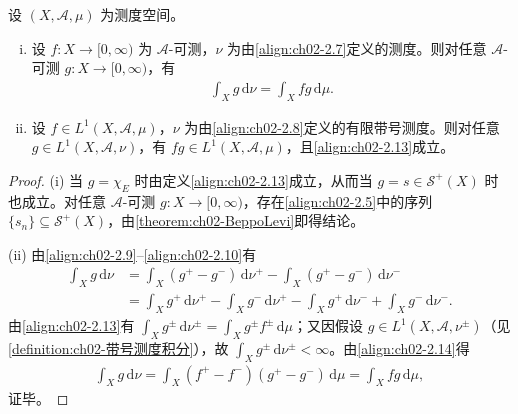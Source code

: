 \documentclass[../../main.tex]{subfiles}%
\begin{document}
\begin{proposition}\label{proposition:ch02-变量替换积分}
设 $(X,\mathscr A,\mu)$ 为测度空间。
\begin{enumerate}[(i)]
\item 设 $f:X\to[0,\infty)$ 为 $\mathscr A$-可测，$\nu$ 为由\eqref{align:ch02-2.7}定义的测度。则对任意 $\mathscr A$-可测 $g:X\to[0,\infty)$，有
\begin{align}
\int_X g\,\mathrm{d}\nu=\int_X fg\,\mathrm{d}\mu. \label{align:ch02-2.13}
\end{align}
\item 设 $f\in L^1(X,\mathscr A,\mu)$，$\nu$ 为由\eqref{align:ch02-2.8}定义的有限带号测度。则对任意 $g\in L^1(X,\mathscr A,\nu)$，有 $fg\in L^1(X,\mathscr A,\mu)$，且\eqref{align:ch02-2.13}成立。
\end{enumerate}
\end{proposition}

\begin{proof}
(i) 当 $g=\chi_E$ 时由定义\eqref{align:ch02-2.13}成立，从而当 $g=s\in\mathscr S^+(X)$ 时也成立。对任意 $\mathscr A$-可测 $g:X\to[0,\infty)$，存在\eqref{align:ch02-2.5}中的序列 $\{s_n\}\subseteq\mathscr S^+(X)$，由\cref{theorem:ch02-BeppoLevi}即得结论。

(ii) 由\eqref{align:ch02-2.9}--\eqref{align:ch02-2.10}有
\begin{align}
\int_X g\,\mathrm{d}\nu
&=\int_X(g^+-g^-)\,\mathrm{d}\nu^+-\int_X(g^+-g^-)\,\mathrm{d}\nu^- \nonumber\\
&=\int_X g^+\,\mathrm{d}\nu^+-\int_X g^-\,\mathrm{d}\nu^+-\int_X g^+\,\mathrm{d}\nu^-+\int_X g^-\,\mathrm{d}\nu^-. \label{align:ch02-2.14}
\end{align}
由\eqref{align:ch02-2.13}有 $\int_X g^\pm\,\mathrm{d}\nu^\pm=\int_X g^\pm f^\pm\,\mathrm{d}\mu$；又因假设 $g\in L^1(X,\mathscr A,\nu^\pm)$（见\cref{definition:ch02-带号测度积分}），故 $\int_X g^\pm\,\mathrm{d}\nu^\pm<\infty$。由\eqref{align:ch02-2.14}得
\begin{align*}
\int_X g\,\mathrm{d}\nu=\int_X(f^+-f^-)(g^+-g^-)\,\mathrm{d}\mu=\int_X fg\,\mathrm{d}\mu,
\end{align*}
证毕。
\end{proof}
\end{document}
